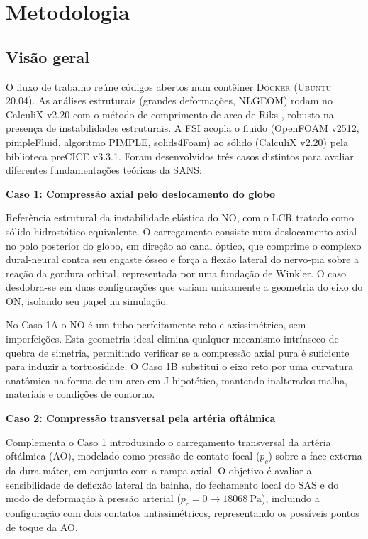 \documentclass[article, hidelinks,oneside,12pt]{abntex2}
\begin{document}
\section*{Metodologia}

\subsection*{Visão geral}

O fluxo de trabalho reúne códigos abertos num contêiner \textsc{Docker} (\textsc{Ubuntu} 20.04). As análises estruturais (grandes deformações, NLGEOM) rodam no CalculiX v2.20 com o método de comprimento de arco de Riks \cite{riks1979}, robusto na presença de instabilidades estruturais. A FSI acopla o fluido (OpenFOAM v2512, pimpleFluid, algoritmo PIMPLE, solids4Foam) ao sólido (CalculiX v2.20) pela biblioteca preCICE v3.3.1. Foram desenvolvidos três casos distintos para avaliar diferentes fundamentações teóricas da SANS:

\textbf{Caso 1: Compressão axial pelo deslocamento do globo}

Referência estrutural da instabilidade elástica do NO, com o LCR tratado como sólido hidrostático equivalente. O carregamento consiste num deslocamento axial no polo posterior do globo, em direção ao canal óptico, que comprime o complexo dural-neural contra seu engaste ósseo e força a flexão lateral do nervo-pia sobre a reação da gordura orbital, representada por uma fundação de Winkler. O caso desdobra-se em duas configurações que variam unicamente a geometria do eixo do ON, isolando seu papel na simulação.

No Caso 1A o NO é um tubo perfeitamente reto e axissimétrico, sem imperfeições. Esta geometria ideal elimina qualquer mecanismo intrínseco de quebra de simetria, permitindo verificar se a compressão axial pura é suficiente para induzir a tortuosidade. O Caso 1B substitui o eixo reto por uma curvatura anatômica na forma de um arco em J hipotético, mantendo inalterados malha, materiais e condições de contorno. 

\textbf{Caso 2: Compressão transversal pela artéria oftálmica}

Complementa o Caso 1 introduzindo o carregamento transversal da artéria oftálmica (AO), modelado como pressão de contato focal ($p_c$) sobre a face externa da dura-máter, em conjunto com a rampa axial. O objetivo é avaliar a sensibilidade de deflexão lateral da bainha, do fechamento local do SAS e do modo de deformação à pressão arterial ($p_c = 0 \to \SI{18068}{\pascal}$), incluindo a configuração com dois contatos antissimétricos, representando os possíveis pontos de toque da AO.
\end{document}
